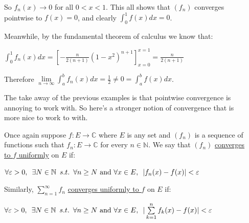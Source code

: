 \documentclass{book}
\newcommand{\hOne}{%
   \color{Black}%
   \fontsize{14}{16}\selectfont%
}
\newenvironment{myIndent}{%
   \begin{adjustwidth}{2.5em}{0em}%
}{%
   \end{adjustwidth}%
}
\newcommand{\udefine}[1]{{%
   \setulcolor{Red}%
   \setul{0.14em}{0.07em}%
   \ul{#1}%
}}
\newcommand{\suchthat}{ \hspace{0.5em}s.t.\hspace{0.5em}}
\newcommand{\myHS}{ \hspace{0.5em}}
\newcommand{\retTwo}{\hfill\bigbreak}
\begin{document}
\begin{enumerate}
{\begin{myIndent}
      So $f_n(x) \rightarrow 0$ for all $0 < x < 1$. This all shows that $(f_n)$ converges\\ pointwise to $f(x) = 0$, and clearly $\int_0^1 f(x)dx = 0$.\retTwo

      Meanwhile, by the fundamental theorem of calculus we know that:
      
      {\centering$\int_0^1 f_n(x)dx = \left[ -\frac{n}{2(n+1)}(1-x^2)^{n+1}\right]^{x=1}_{x=0} = \frac{n}{2(n+1)}$ \retTwo\par}

      Therefore $\lim\limits_{n\rightarrow \infty} \int_a^b f_n(x)dx = \frac{1}{2} \neq 0 = \int_a^b f(x)dx$.
   \end{myIndent}}
\end{enumerate}

\newpage

\hOne The take away of the previous examples is that pointwise convergence is\\ annoying to work with. So here's a stronger notion of convergence that is\\ more nice to work to with.\retTwo

Once again suppose $f: E \longrightarrow \mathbb{C}$ where $E$ is any set and $(f_n)$ is a sequence of\\ functions such that $f_n: E \longrightarrow \mathbb{C}$ for every $n \in \mathbb{N}$. We say that $(f_n)$ \udefine{converges\\ to $f$ uniformly} on $E$ if:

{\centering $\forall \varepsilon > 0,\myHS \exists N \in \mathbb{N} \suchthat \forall n \geq N \text{ and } \forall x \in E,\myHS |f_n(x) - f(x)| < \varepsilon$ \retTwo\par}

Similarly, $\sum\limits_{n=1}^\infty f_n$\hspace{0.1em} \udefine{converges uniformly to $f$} on $E$ if:\\ [-10pt]

{\centering $\forall \varepsilon > 0,\myHS \exists N \in \mathbb{N} \suchthat \forall n \geq N \text{ and } \forall x \in E,\myHS |\sum\limits_{k=1}^n f_k(x) - f(x)| < \varepsilon$ \retTwo\par}
\end{document}
